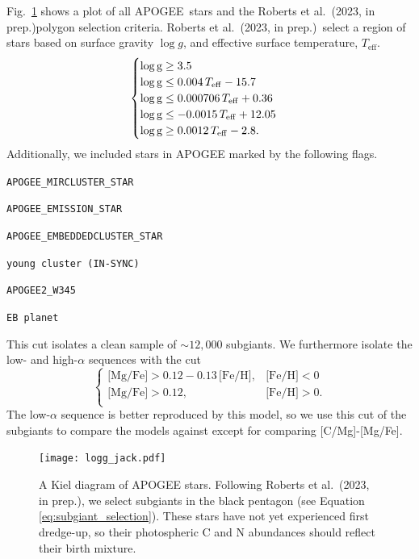 \documentclass[fleqn,
usenatbib]{mnras}
\newcommand{\citetjack}{Roberts et al.~(2023, in prep.)}
\newcommand{\apogee}{APOGEE}
\newcommand{\caafe}{[C/Mg]-[Mg/Fe]}
\newcommand{\about}[1]{${\sim} #1$}
\begin{document}
Fig.~\ref{fig:subgiant_selection} shows a plot of all \apogee\ stars and the \citetjack polygon selection criteria. 
 \citetjack~select a region of stars based on surface gravity $\log g$, and effective surface temperature, $T_\text{eff}$.
 \begin{equation}
    \begin{cases} \label{eq:subgiant_selection}
        \log \text{g} \geq 3.5 \\
        \log \text{g} \leq 0.004\,T_{\rm eff} - 15.7 \\
        \log \text{g} \leq 0.000706\,T_{\rm eff} + 0.36 \\
        \log \text{g} \leq -0.0015\,T_{\rm eff} + 12.05 \\
        \log \text{g} \geq 0.0012\,T_{\rm eff} - 2.8. \\
    \end{cases}
\end{equation}
Additionally, we included stars in \apogee{} marked by the following flags.
\begin{description}
\item \verb|APOGEE_MIRCLUSTER_STAR|
\item \verb|APOGEE_EMISSION_STAR|
\item \verb|APOGEE_EMBEDDEDCLUSTER_STAR|
\item \verb|young cluster (IN-SYNC)|
\item \verb|APOGEE2_W345|
\item \verb|EB planet|
\end{description}
This cut isolates a clean sample of \about{12,000} subgiants.
We furthermore isolate the low- and high-$\alpha$ sequences with the cut
\begin{equation}\label{eq:high_alpha}
\begin{cases}
\text{[Mg/Fe]} >0.12-0.13\,\text{[Fe/H]}, & \text{[Fe/H]}<0\\
\text{[Mg/Fe]} >0.12, & \text{[Fe/H]}>0. \\
\end{cases}
\end{equation}
The low-$\alpha$ sequence is better reproduced by this model, so we use this cut of the subgiants to compare the models against except for comparing \caafe. 




\begin{figure}
    \centering
    \texttt{[image: logg\_jack.pdf]}
    \caption[]{
        A Kiel diagram of \apogee{} stars. Following \citetjack, we select subgiants in the black pentagon (see Equation \ref{eq:subgiant_selection}). These stars have not yet experienced first dredge-up, so their photospheric C and N abundances should reflect their birth mixture.
    }
    \label{fig:subgiant_selection}
\end{figure}
\end{document}
